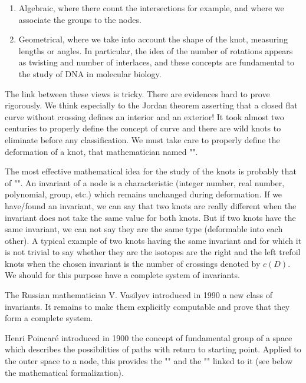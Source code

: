 {\begin{enumerate}
		\item Algebraic, where there count the intersections for example, and where we associate the groups to the nodes.
		
		\item Geometrical, where we take into account the shape of the knot, measuring lengths or angles. In particular, the idea of the number of rotations appears as twisting and number of interlaces, and these concepts are fundamental to the study of DNA in molecular biology.
	\end{enumerate}
	
	The link between these views is tricky. There are evidences hard to prove rigorously. We think especially to the Jordan theorem asserting that a closed flat curve without crossing defines an interior and an exterior! It took almost two centuries to properly define the concept of curve and there are wild knots to eliminate before any classification. We must take care to properly define the deformation of a knot, that mathematician named "".
	
	The most effective mathematical idea for the study of the knots is probably that of "". An invariant of a node is a characteristic (integer number, real number, polynomial, group, etc.) which remains unchanged during deformation. If we have/found an invariant, we can say that two knots are really different when the invariant does not take the same value for both knots. But if two knots have the same invariant, we can not say they are the same type (deformable into each other). A typical example of two knots having the same invariant and for which it is not trivial to say whether they are the isotopes are the right and the left trefoil knots when the chosen invariant is the number of crossings denoted by $c(D)$. We should for this purpose have a complete system of invariants.
	
	The Russian mathematician V. Vasilyev introduced in 1990 a new class of invariants. It remains to make them explicitly computable and prove that they form a complete system.
	
	Henri Poincaré introduced in 1900 the concept of fundamental group of a space which describes the possibilities of paths with return to starting point. Applied to the outer space to a node, this provides the "" and the "" linked to it (see below the mathematical formalization).
	
}
